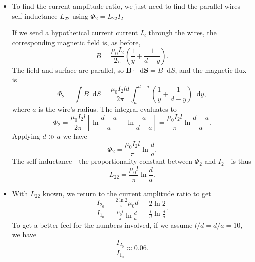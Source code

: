 \documentclass[11pt, a4paper]{article}
\newcommand{\diff}{\mathop{}\!\mathrm{d}} %
\renewcommand{\vec}[1]{\bm{#1}} %
\newcommand{\mm}{\mu_{0}}  %
\newcommand{\m}{\vec{m}}  %
\begin{document}
\begin{itemize}
	\item To find the current amplitude ratio, we just need to find the parallel wires self-inductance $ L_{22} $ using $ \Phi_{2} = L_{22}I_{2} $
	
	If we send a hypothetical current current $ I_{2} $ through the wires, the corresponding magnetic field is, as before,
	\begin{equation*}
		B = \frac{\mm I_{2}}{2\pi} \left(\frac{1}{y} + \frac{1}{d-y}\right) .
	\end{equation*}
	The field and surface are parallel, so $ \vec{B} \cdot \diff \vec{S} = B \diff S $, and the magnetic flux is
	\begin{equation*}
		\Phi_{2} = \int B \diff S = \frac{\mm I_{2} l d}{2 \pi}\int_{a}^{d-a}\left(\frac{1}{y} + \frac{1}{d-y}\right)\diff y,
	\end{equation*}
	where $ a $ is the wire's radius. The integral evaluates to
	\begin{equation*}
		\Phi_{2} = \frac{\mm I_{2} l}{2 \pi}\left[\ln \frac{d-a}{a} - \ln \frac{a}{d-a}\right] = \frac{\mm I_{2} l}{\pi} \ln \frac{d-a}{a}.
	\end{equation*}
	Applying $ d \gg a $ we have
	\begin{equation*}
		\Phi_{2} = \frac{\mm I_{2} l}{\pi} \ln \frac{d}{a}.
	\end{equation*}
	The self-inductance---the proportionality constant between $ \Phi_{2} $ and $ I_{2} $---is thus
	\begin{equation*}
		L_{22} = \frac{\mm l}{\pi}\ln \frac{d}{a}.
	\end{equation*}
	
	\item With $ L_{22} $ known, we return to the current amplitude ratio to get
	\begin{equation*}
		\frac{I_{2_{0}}}{I_{1_{0}}} = \frac{\frac{2\ln 2}{\pi} \mm d}{\frac{\mm l}{\pi}\ln \frac{d}{a}} = \frac{2\ln 2}{\frac{l}{d} \ln \frac{d}{a}}.
	\end{equation*}
	To get a better feel for the numbers involved, if we assume $ l/d = d/a = 10 $, we have 
	\begin{equation*}
		\frac{I_{2_{0}}}{I_{1_{0}}} \approx 0.06.
	\end{equation*}
\end{itemize}
\end{document}

